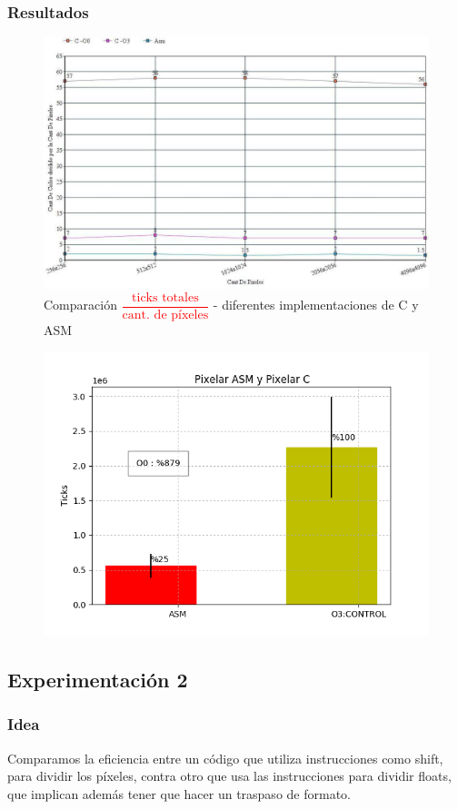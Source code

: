 \subsubsection{Resultados}
	\begin{figure}[H]
	\centering
	\includegraphics[width = 15 cm, height = 10 cm]{imagenes/pixeAsmC.jpg}
	\caption[center]{Comparación \textcolor{red}{$\dfrac{\text{ticks totales}}{\text{cant. de píxeles}}$} - diferentes implementaciones de C y ASM}
\end{figure}
	\begin{figure}[H]
	\centering
	\includegraphics[width = 10 cm, height = 6.5 cm]{imagenes/ASMvsCPixelar.png}
	\caption[center]{}
\end{figure}


\subsection{Experimentación 2}
\subsubsection{Idea}
\par{Comparamos la eficiencia entre un código que utiliza instrucciones como shift, para dividir los píxeles, contra otro que usa las instrucciones para dividir floats, que implican además tener que hacer un traspaso de formato.}

